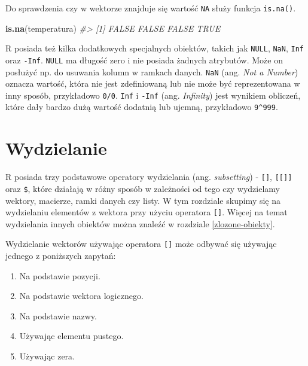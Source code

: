 \documentclass[paper=6in:9in,pagesize=pdftex,headinclude=on,footinclude=on,10pt]{scrbook}
\makeatletter
\newenvironment{Shaded}{\begin{snugshade}}{\end{snugshade}}
\newcommand{\CommentTok}[1]{\textcolor[rgb]{0.56,0.35,0.01}{\textit{#1}}}
\newcommand{\KeywordTok}[1]{\textcolor[rgb]{0.13,0.29,0.53}{\textbf{#1}}}
\newcommand{\NormalTok}[1]{#1}
\providecommand{\tightlist}{%
  \setlength{\itemsep}{0pt}\setlength{\parskip}{0pt}}
\newenvironment{kframe}{%
\medskip{}
\setlength{\fboxsep}{.8em}
 \def\at@end@of@kframe{}%
 \ifinner\ifhmode%
  \def\at@end@of@kframe{\end{minipage}}%
  \begin{minipage}{\columnwidth}%
 \fi\fi%
 \def\FrameCommand##1{\hskip\@totalleftmargin \hskip-\fboxsep
 \colorbox{shadecolor}{##1}\hskip-\fboxsep
     \hskip-\linewidth \hskip-\@totalleftmargin \hskip\columnwidth}%
 \MakeFramed {\advance\hsize-\width
   \@totalleftmargin\z@ \linewidth\hsize
   \@setminipage}}%
 {\par\unskip\endMakeFramed%
 \at@end@of@kframe}
\newenvironment{rmdblock}[1]
  {
  \begin{itemize}
  \renewcommand{\labelitemi}{
    \raisebox{-.7\height}[0pt][0pt]{
      {\setkeys{Gin}{width=3em,keepaspectratio}\texttt{[image: images/\#1]}}
    }
  }
  \setlength{\fboxsep}{1em}
  \begin{kframe}
  \item
  }
  {
  \end{kframe}
  \end{itemize}
  }
\newenvironment{rmdinfo}
  {\begin{rmdblock}{compass}}
  {\end{rmdblock}}
\makeatother
\begin{document}
Do sprawdzenia czy w wektorze znajduje się wartość \texttt{NA} służy funkcja \texttt{is.na()}.

\begin{Shaded}
\begin{Highlighting}[]
\KeywordTok{is.na}\NormalTok{(temperatura)}
\CommentTok{#> [1] FALSE FALSE FALSE  TRUE}
\end{Highlighting}
\end{Shaded}

\begin{rmdinfo}
\begin{rmdinfo}

R posiada też kilka dodatkowych specjalnych obiektów, takich jak \texttt{NULL}, \texttt{NaN}, \texttt{Inf} oraz \texttt{-Inf}.
\texttt{NULL} ma długość zero i nie posiada żadnych atrybutów.
Może on posłużyć np. do usuwania kolumn w ramkach danych.
\texttt{NaN} (ang. \emph{Not a Number}) oznacza wartość, która nie jest zdefiniowaną lub nie może być reprezentowana w inny sposób, przykładowo \texttt{0/0}.
\texttt{Inf} i \texttt{-Inf} (ang. \emph{Infinity}) jest wynikiem obliczeń, które dały bardzo dużą wartość dodatnią lub ujemną, przykładowo \texttt{9\^{}999}.

\end{rmdinfo}
\end{rmdinfo}

\hypertarget{wydzielanie}{%
\section{Wydzielanie}\label{wydzielanie}}

R posiada trzy podstawowe operatory wydzielania (ang. \emph{subsetting}) - \texttt{{[}{]}}, \texttt{{[}{[}{]}{]}} oraz \texttt{\$}, które działają w różny sposób w zależności od tego czy wydzielamy wektory, macierze, ramki danych czy listy.
W tym rozdziale skupimy się na wydzielaniu elementów z wektora przy użyciu operatora \texttt{{[}{]}}.
Więcej na temat wydzielania innych obiektów można znaleźć w rozdziale \ref{zlozone-obiekty}.

Wydzielanie wektorów używając operatora \texttt{{[}{]}} może odbywać się używając jednego z poniższych zapytań:

\begin{enumerate}
\def\labelenumi{\arabic{enumi}.}
\tightlist
\item
  Na podstawie pozycji.
\item
  Na podstawie wektora logicznego.
\item
  Na podstawie nazwy.
\item
  Używając elementu pustego.
\item
  Używając zera.
\end{enumerate}
\end{document}
